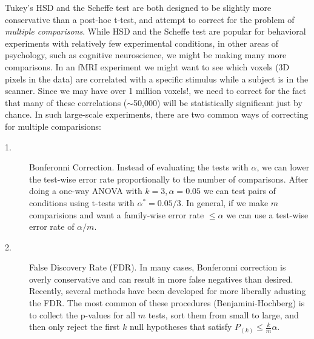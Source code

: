 \documentclass{tufte-handout}
\begin{document}
Tukey's HSD and the Scheffe test are both designed to be slightly more conservative than a post-hoc t-test, and attempt to correct for the problem of \emph{multiple comparisons}. While HSD and the Scheffe test are popular for behavioral experiments with relatively few experimental conditions, in other areas of psychology, such as cognitive neuroscience, we might be making many more comparisons. In an fMRI experiment we might want to see which voxels (3D pixels in the data) are correlated with a specific stimulus while a subject is in the scanner. Since we may have over 1 million voxels!, we need to correct for the fact that many of these correlations ($\sim$50,000) will be statistically significant just by chance. In such large-scale experiments, there are two common ways of correcting for multiple comparisions:

\begin{description}
\item[1.]Bonferonni Correction. Instead of evaluating the tests with $\alpha$, we can lower the test-wise error rate proportionally to the number of comparisons. After doing a one-way ANOVA with $k=3, \alpha=0.05$ we can test pairs of conditions using t-tests with $\alpha^*=0.05/3$. In general, if we make $m$ comparisions and want a family-wise error rate $\leq\alpha$ we can use a test-wise error rate of $\alpha/m$.
\item[2.]False Discovery Rate (FDR). In many cases, Bonferonni correction is overly conservative and can result in more false negatives than desired. Recently, several methods have been developed for more liberally adusting the FDR. The most common of these procedures (Benjamini-Hochberg) is to collect the p-values for all $m$ tests, sort them from small to large, and then only reject the first $k$ null hypotheses that satisfy $P_{(k)}\leq \frac{k}{m}\alpha$.
\end{description}
\end{document}
